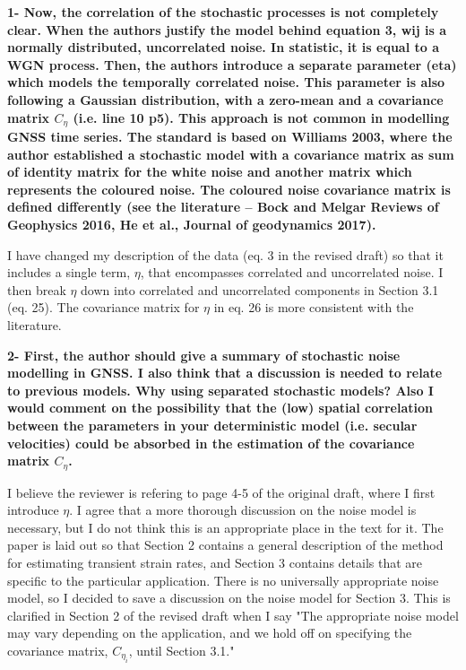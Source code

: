 \documentclass[10pt,a4paper]{letter}
\begin{document}
\begin{letter}{}
\textbf{1- Now, the correlation of the stochastic processes is not completely
clear. When the authors justify the model behind equation 3, wij is a
normally distributed, uncorrelated noise. In statistic, it is equal to
a WGN process. Then, the authors introduce a separate parameter (eta)
which models the temporally correlated noise. This parameter is also
following a Gaussian distribution, with a zero-mean and a covariance
matrix $C_{\eta}$ (i.e. line 10 p5). This approach is not common in
modelling GNSS time series. The standard is based on Williams 2003,
where the author established a stochastic model with a covariance
matrix as sum of identity matrix for the white noise and another
matrix which represents the coloured noise. The coloured noise
covariance matrix is defined differently (see the literature – Bock and
Melgar Reviews of Geophysics 2016, He et al., Journal of geodynamics
2017).}

I have changed my description of the data (eq. 3 in the revised draft)
so that it includes a single term, $\eta$, that encompasses correlated
and uncorrelated noise. I then break $\eta$ down into correlated and
uncorrelated components in Section 3.1 (eq. 25). The covariance matrix
for $\eta$ in eq. 26 is more consistent with the literature.

\textbf{2- First, the author should give a summary of stochastic noise
modelling in GNSS. I also think that a discussion is needed to relate
to previous models. Why using separated stochastic models? Also I
would comment on the possibility that the (low) spatial correlation
between the parameters in your deterministic model (i.e. secular
velocities) could be absorbed in the estimation of the covariance
matrix $C_{\eta}$.}

I believe the reviewer is refering to page 4-5 of the original draft,
where I first introduce $\eta$. I agree that a more thorough
discussion on the noise model is necessary, but I do not think this is
an appropriate place in the text for it. The paper is laid out so that
Section 2 contains a general description of the method for estimating
transient strain rates, and Section 3 contains details that are
specific to the particular application. There is no universally
appropriate noise model, so I decided to save a discussion on the
noise model for Section 3. This is clarified in Section 2 of the
revised draft when I say "The appropriate noise model may vary
depending on the application, and we hold off on specifying the
covariance matrix, $C_{\eta_i}$, until Section 3.1."


\end{letter}
\end{document}
